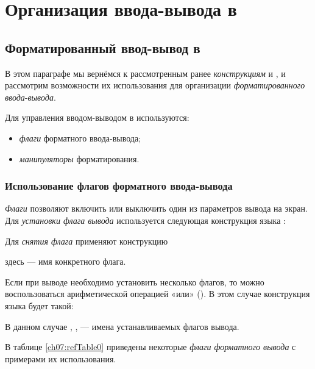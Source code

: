 \chapter[Организация ввода-вывода в \Sys{C++}]{Организация ввода-вывода в }
\section[Форматированный ввод-вывод в \Sys{C++}]{Форматированный ввод-вывод в }
В этом параграфе мы вернёмся к рассмотренным ранее \emph{конструкциям}  и
, и рассмотрим возможности их использования для организации \emph{форматированного 
}\emph{ввода}-\emph{вывода}.


Для управления вводом-выводом в  используются:

\begin{itemize}
\item \emph{флаги} форматного ввода-вывода;
\item \emph{манипуляторы} форматирования.
\end{itemize}

\subsection[Использование флагов форматного ввода-вывода]{Использование флагов форматного ввода-вывода}
\label{ch07:1.1}
\emph{Флаги} позволяют включить или выключить один из параметров вывода
на экран. Для \emph{установки флага вывода} используется следующая конструкция языка
:


Для \emph{снятия флага} применяют конструкцию 


здесь  --- имя конкретного флага.

Если при выводе необходимо установить несколько флагов, то можно воспользоваться арифметической операцией «или»
(\Sys{\textbar}). В этом случае конструкция языка  будет такой:


В данном случае , ,  --- имена устанавливаемых
флагов вывода.

В таблице \ref{ch07:refTable0} приведены некоторые \emph{флаги форматного вывода} с примерами их
использования. 


